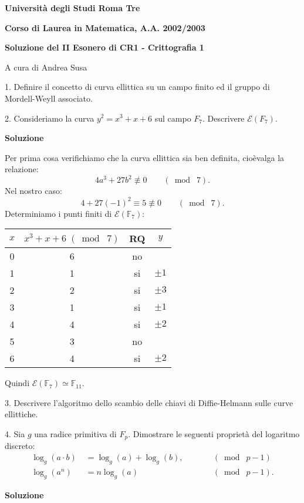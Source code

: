 \documentclass[italian,a4paper,10pt]{report}
\newcommand{\e}{\`e\;}
\newcommand{\F}{\mathbb{F}}
\newcommand{\El}{\mathcal{E}}
\begin{document}
\centerline{{\bf Universit\`a degli Studi Roma Tre}}
\centerline{{\bf Corso di Laurea in Matematica, A.A. 2002/2003}}
\centerline{{\bf Soluzione del II Esonero di CR1 - Crittografia
1}} \centerline{A cura di Andrea Susa} \vspace{15mm}

1. Definire il concetto di  curva ellittica su un campo finito ed
il gruppo di Mordell-Weyll associato. \vspace{3mm}

2. Consideriamo la curva $y^2 = x^3 +x + 6$ sul campo
 $F_{7}$. Descrivere $\El(F_{7})$.

{\bf Soluzione}

Per prima cosa verifichiamo che la curva ellittica sia ben
definita, cio\e valga la relazione:
$$
4a^3 + 27b^2 \not\equiv 0  \qquad (\bmod\;7).
$$
Nel nostro caso:
$$
4 + 27(-1)^2 \equiv 5 \not\equiv 0\qquad (\bmod\;7).
$$
Determiniamo i punti finiti di $\mathcal{E}(\F_7)$:
\begin{center}
\begin{tabular}{|c|c|c|c|}
  \hline
  $x$ & $x^3+x+6 \;(\bmod\;7)$ & RQ & $y$ \\
 \hline
  0 & 6 & no &  \\
   \hline
  1 & 1 & si & $\pm 1$ \\
 \hline
  2 & 2 & si & $\pm 3$ \\
\hline
  3 & 1 & si & $\pm 1$ \\
\hline
  4 & 4 & si & $\pm 2$ \\
  \hline
  5 & 3 & no &  \\ \hline
 6 & 4 & si & $\pm 2$ \\ \hline
\end{tabular}
\end{center}

Quindi $\El(\F_7) \simeq \F_{11}$.



 3. Descrivere l'algoritmo dello scambio delle chiavi di Diffie-Helmann sulle
curve
 ellittiche. \vspace{5mm}

4. Sia $g$ una radice primitiva di $F_p$. Dimostrare le seguenti
propriet\`{a} del logaritmo discreto:
\begin{align*}
\log_g(a\cdot b) \; &= \log_g(a) + \log_g(b), \qquad &&(\bmod\;p-1)\\
\log_g(a^n) &= n \log_g(a) \qquad &&(\bmod\;p-1).
\end{align*}

{\bf Soluzione}
\end{document}
